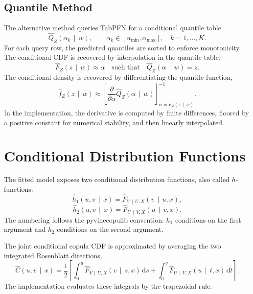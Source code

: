 \documentclass[11pt]{article}
\newcommand{\dd}{\,\mathrm{d}}
\newcommand{\given}{\,\mid\,}
\begin{document}
\subsection{Quantile Method}

The alternative method queries TabPFN for a conditional quantile table
\[
  \widehat Q_Z(\alpha_k \given w),
  \qquad
  \alpha_k \in [\alpha_{\min},\alpha_{\max}],
  \quad k=1,\dots,K.
\]
For each query row, the predicted quantiles are sorted to enforce
monotonicity. The conditional CDF is recovered by interpolation in the
quantile table:
\[
  \widehat F_Z(z \given w)
  \approx
  \alpha
  \quad\text{such that}\quad
  \widehat Q_Z(\alpha \given w) = z.
\]
The conditional density is recovered by differentiating the quantile
function,
\begin{equation}
  \widehat f_Z(z \given w)
  \approx
  \left[
    \frac{\partial}{\partial \alpha}
    \widehat Q_Z(\alpha \given w)
  \right]^{-1}_{\alpha=\widehat F_Z(z \given w)}.
  \label{eq:quantile-density}
\end{equation}
In the implementation, the derivative is computed by finite differences,
floored by a positive constant for numerical stability, and then linearly
interpolated.

\section{Conditional Distribution Functions}

The fitted model exposes two conditional distribution functions, also
called $h$-functions:
\begin{equation}
  \widehat h_1(u,v \given x)
  =
  \widehat F_{V \given U,X}(v \given u,x),
  \label{eq:hfunc1}
\end{equation}
\begin{equation}
  \widehat h_2(u,v \given x)
  =
  \widehat F_{U \given V,X}(u \given v,x).
  \label{eq:hfunc2}
\end{equation}
The numbering follows the pyvinecopulib convention: $h_1$ conditions on
the first argument and $h_2$ conditions on the second argument.

The joint conditional copula CDF is approximated by averaging the two
integrated Rosenblatt directions,
\begin{equation}
  \widehat C(u,v \given x)
  =
  \frac{1}{2}
  \left[
    \int_0^u
    \widehat F_{V \given U,X}(v \given s,x)\dd s
    +
    \int_0^v
    \widehat F_{U \given V,X}(u \given t,x)\dd t
  \right].
  \label{eq:joint-cdf}
\end{equation}
The implementation evaluates these integrals by the trapezoidal rule.
\end{document}
